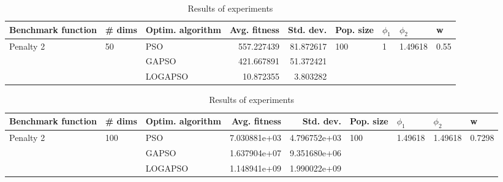 \documentclass{article}
\begin{document}
\begin{table}
\centering
\caption{Results of experiments}
\begin{tabular}{lllrrllll}
\toprule
        Benchmark function &             \# dims & Optim. algorithm &  Avg. fitness &  Std. dev. &            Pop. size &         $\phi_{1}$ &               $\phi_{2}$ &                     w \\
\midrule
\multirow{3}{*}{Penalty 2} & \multirow{3}{*}{50} &              PSO &    557.227439 &  81.872617 & \multirow{3}{*}{100} & \multirow{3}{*}{1} & \multirow{3}{*}{1.49618} & \multirow{3}{*}{0.55} \\
                           &                     &            GAPSO &    421.667891 &  51.372421 &                      &                    &                          &                       \\
                           &                     &          LOGAPSO &     10.872355 &   3.803282 &                      &                    &                          &                       \\
\bottomrule
\end{tabular}
\end{table}
\begin{table}
\centering
\caption{Results of experiments}
\begin{tabular}{lllrrllll}
\toprule
        Benchmark function &              \# dims & Optim. algorithm &  Avg. fitness &    Std. dev. &            Pop. size &               $\phi_{1}$ &               $\phi_{2}$ &                       w \\
\midrule
\multirow{3}{*}{Penalty 2} & \multirow{3}{*}{100} &              PSO &  7.030881e+03 & 4.796752e+03 & \multirow{3}{*}{100} & \multirow{3}{*}{1.49618} & \multirow{3}{*}{1.49618} & \multirow{3}{*}{0.7298} \\
                           &                      &            GAPSO &  1.637904e+07 & 9.351680e+06 &                      &                          &                          &                         \\
                           &                      &          LOGAPSO &  1.148941e+09 & 1.990022e+09 &                      &                          &                          &                         \\
\bottomrule
\end{tabular}
\end{table}
\end{document}
